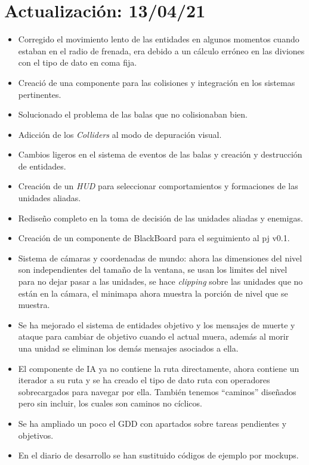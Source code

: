 \section{Actualización: 13/04/21}
\begin{itemize}
	\item Corregido el movimiento lento de las entidades en algunos momentos cuando estaban en el radio
	de frenada, era debido a un cálculo erróneo en las diviones con el tipo de dato en coma fija.
	
	\item Creació de una componente para las colisiones y integración en los sistemas pertinentes.
	
	\item Solucionado el problema de las balas que no colisionaban bien.
	
	\item Adicción de los \textit{Colliders} al modo de depuración visual.
	
	\item Cambios ligeros en el sistema de eventos de las balas y creación y destrucción de entidades.
	
	\item Creación de un \textit{HUD} para seleccionar comportamientos y formaciones de las unidades
	aliadas.
	
	\item Rediseño completo en la toma de decisión de las unidades aliadas y enemigas.

	\item Creación de un componente de BlackBoard para el seguimiento al pj v0.1.
	
	\item Sistema de cámaras y coordenadas de mundo: ahora las dimensiones del nivel son independientes
	del tamaño de la ventana, se usan los limites del nivel para no dejar pasar a las unidades, se hace
	\textit{clipping} sobre las unidades que no están en la cámara, el minimapa ahora muestra la porción
	de nivel que se muestra.
	
	\item Se ha mejorado el sistema de entidades objetivo y los mensajes de muerte y ataque para cambiar
	de objetivo cuando el actual muera, además al morir una unidad se eliminan los demás mensajes asociados
	a ella.

	\item El componente de \ac{IA} ya no contiene la ruta directamente, ahora contiene un iterador a su
	ruta y se ha creado el tipo de dato ruta con operadores sobrecargados para navegar por ella. También
	tenemos ``caminos'' diseñados pero sin incluir, los cuales son caminos no cíclicos.

	\item Se ha ampliado un poco el GDD con apartados sobre tareas pendientes y objetivos.

	\item En el diario de desarrollo se han sustituido códigos de ejemplo por mockups.  
\end{itemize}

